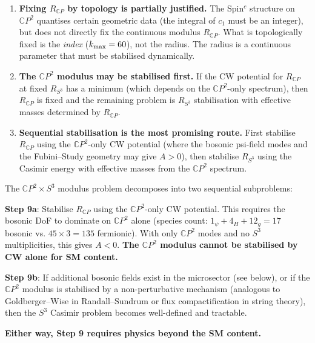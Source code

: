 \documentclass[11pt,a4paper]{article}
\newcommand{\CP}{\mathbb{C}P}
\newcommand{\kmax}{k_{\rm max}}
\newcounter{findingctr}
\newenvironment{finding}[1][]{%
  \refstepcounter{findingctr}%
  \begin{tcolorbox}[colback=blue!3!white, colframe=blue!50!black,
    title=\textbf{Finding \thefindingctr: #1}]
}{%
  \end{tcolorbox}%
}
\begin{document}
\begin{enumerate}
\item \textbf{Fixing $R_{\CP}$ by topology is partially justified.}
  The Spin$^c$ structure on $\CP^2$ quantises certain geometric
  data (the integral of $c_1$ must be an integer), but does not
  directly fix the continuous modulus $R_{\CP}$. What is topologically
  fixed is the \emph{index} ($\kmax = 60$), not the radius. The
  radius is a continuous parameter that must be stabilised dynamically.

\item \textbf{The $\CP^2$ modulus may be stabilised first.} If the
  CW potential for $R_{\CP}$ at fixed $R_{S^3}$ has a minimum
  (which depends on the $\CP^2$-only spectrum), then $R_{\CP}$ is
  fixed and the remaining problem is $R_{S^3}$ stabilisation with
  effective masses determined by $R_{\CP}$.

\item \textbf{Sequential stabilisation is the most promising route.}
  First stabilise $R_{\CP}$ using the $\CP^2$-only CW potential
  (where the bosonic psi-field modes and the Fubini--Study geometry
  may give $A > 0$), then stabilise $R_{S^3}$ using the Casimir
  energy with effective masses from the $\CP^2$ spectrum.
\end{enumerate}

\begin{finding}[Sequential Modulus Stabilisation Is the Most
  Tractable Route]
\label{find:sequential}
The $\CP^2 \times S^3$ modulus problem decomposes into two
sequential subproblems:

\textbf{Step 9a}: Stabilise $R_{\CP}$ using the $\CP^2$-only
CW potential. This requires the bosonic DoF to dominate on $\CP^2$
alone (species count: $1_\psi + 4_H + 12_g = 17$ bosonic vs.
$45 \times 3 = 135$ fermionic). With only $\CP^2$ modes and no
$S^3$ multiplicities, this gives $A < 0$. \textbf{The $\CP^2$
modulus cannot be stabilised by CW alone for SM content.}

\textbf{Step 9b}: If additional bosonic fields exist in the
microsector (see below), or if the $\CP^2$ modulus is stabilised
by a non-perturbative mechanism (analogous to Goldberger--Wise
in Randall--Sundrum or flux compactification in string theory),
then the $S^3$ Casimir problem becomes well-defined and tractable.

\textbf{Either way, Step 9 requires physics beyond the SM content.}
\end{finding}


\end{document}
